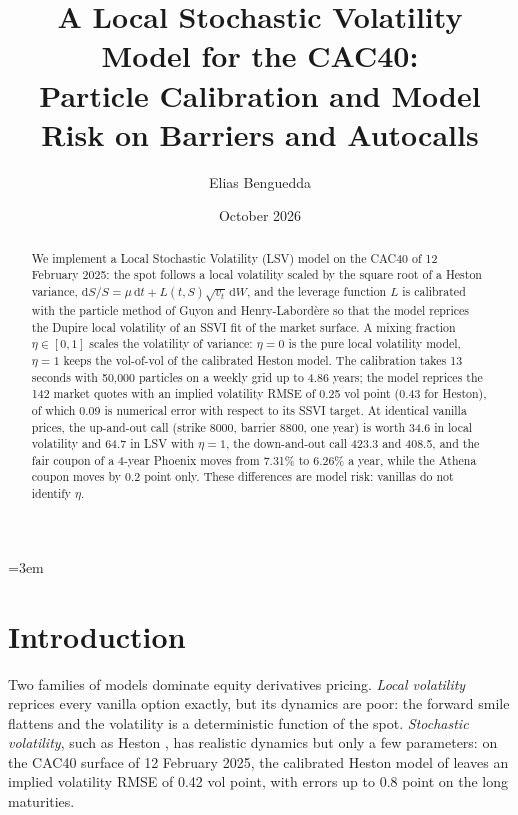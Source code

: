 \documentclass[11pt,a4paper]{article}
\title{A Local Stochastic Volatility Model for the CAC40:\\
Particle Calibration and Model Risk on Barriers and Autocalls}
\author{Elias Benguedda}
\date{October 2026}
\newcommand{\dd}{\mathrm{d}}
\begin{document}
\emergencystretch=3em
\maketitle

\begin{abstract}
We implement a Local Stochastic Volatility (LSV) model on the CAC40 of 12 February 2025: the spot follows a local
volatility scaled by the square root of a Heston variance, $\dd S/S = \mu\,\dd t + L(t,S)\sqrt{v_t}\,\dd W$, and the
leverage function $L$ is calibrated with the particle method of Guyon and Henry-Labordère so that the model reprices
the Dupire local volatility of an SSVI fit of the market surface. A mixing fraction $\eta \in [0,1]$ scales the
volatility of variance: $\eta = 0$ is the pure local volatility model, $\eta = 1$ keeps the vol-of-vol of the
calibrated Heston model. The calibration takes 13 seconds with 50{,}000 particles on a weekly grid up to 4.86 years;
the model reprices the 142 market quotes with an implied volatility RMSE of 0.25 vol point (0.43 for Heston), of
which 0.09 is numerical error with respect to its SSVI target. At identical vanilla prices, the up-and-out call
(strike 8000, barrier 8800, one year) is worth 34.6 in local volatility and 64.7 in LSV with $\eta = 1$, the
down-and-out call 423.3 and 408.5, and the fair coupon of a 4-year Phoenix moves from 7.31\% to 6.26\% a year, while
the Athena coupon moves by 0.2 point only. These differences are model risk: vanillas do not identify $\eta$.
\end{abstract}

\tableofcontents
\newpage

\section{Introduction}
Two families of models dominate equity derivatives pricing. \emph{Local volatility} \cite{dupire1994} reprices every
vanilla option exactly, but its dynamics are poor: the forward smile flattens and the volatility is a deterministic
function of the spot. \emph{Stochastic volatility}, such as Heston \cite{heston1993}, has realistic dynamics but
only a few parameters: on the CAC40 surface of 12 February 2025, the calibrated Heston model of
\cite{benguedda2026heston} leaves an implied volatility RMSE of 0.42 vol point, with errors up to 0.8 point on the
long maturities.
\end{document}
